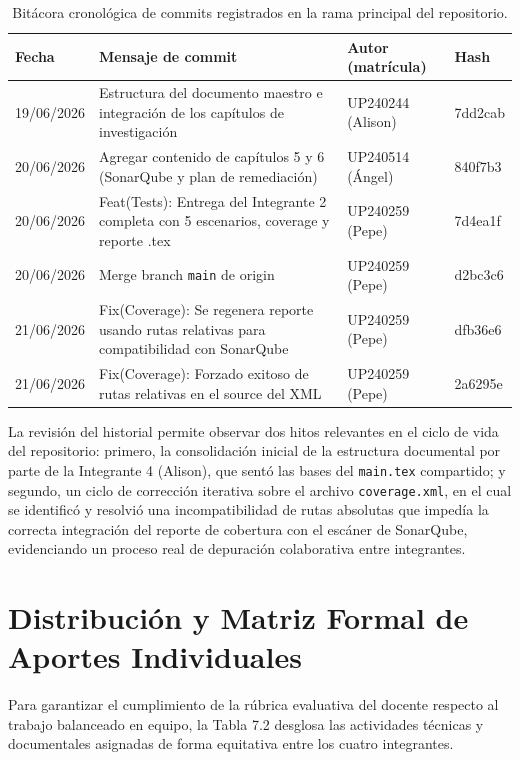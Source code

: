\documentclass[12pt,oneside]{report}
\begin{document}
\begin{table}[H]
\centering
\caption{Bitácora cronológica de commits registrados en la rama principal del repositorio.}
\small
\begin{tabularx}{\textwidth}{|p{2.0cm}|X|p{2.4cm}|p{1.6cm}|}
\hline
\textbf{Fecha} & \textbf{Mensaje de commit} & \textbf{Autor (matrícula)} & \textbf{Hash} \\
\hline
19/06/2026 & Estructura del documento maestro e integración de los capítulos de investigación & UP240244 (Alison) & 7dd2cab \\
\hline
20/06/2026 & Agregar contenido de capítulos 5 y 6 (SonarQube y plan de remediación) & UP240514 (Ángel) & 840f7b3 \\
\hline
20/06/2026 & Feat(Tests): Entrega del Integrante 2 completa con 5 escenarios, coverage y reporte .tex & UP240259 (Pepe) & 7d4ea1f \\
\hline
20/06/2026 & Merge branch \texttt{main} de origin & UP240259 (Pepe) & d2bc3c6 \\
\hline
21/06/2026 & Fix(Coverage): Se regenera reporte usando rutas relativas para compatibilidad con SonarQube & UP240259 (Pepe) & dfb36e6 \\
\hline
21/06/2026 & Fix(Coverage): Forzado exitoso de rutas relativas en el source del XML & UP240259 (Pepe) & 2a6295e \\
\hline
\end{tabularx}
\end{table}

La revisión del historial permite observar dos hitos relevantes en el ciclo de vida del repositorio: primero, la consolidación inicial de la estructura documental por parte de la Integrante 4 (Alison), que sentó las bases del \texttt{main.tex} compartido; y segundo, un ciclo de corrección iterativa sobre el archivo \texttt{coverage.xml}, en el cual se identificó y resolvió una incompatibilidad de rutas absolutas que impedía la correcta integración del reporte de cobertura con el escáner de SonarQube, evidenciando un proceso real de depuración colaborativa entre integrantes.

\section{Distribución y Matriz Formal de Aportes Individuales}
Para garantizar el cumplimiento de la rúbrica evaluativa del docente respecto al trabajo balanceado en equipo, la Tabla 7.2 desglosa las actividades técnicas y documentales asignadas de forma equitativa entre los cuatro integrantes.
\end{document}
